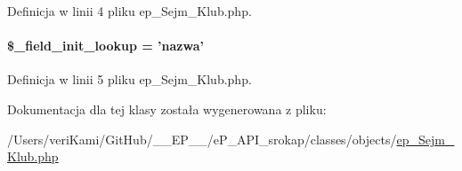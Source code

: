 Definicja w linii 4 pliku ep\-\_\-\-Sejm\-\_\-\-Klub.\-php.

\hypertarget{classep___sejm___klub_a4a4d54ae35428077a7c61ec8a5139af3}{
\paragraph[{\$\-\_\-field\-\_\-init\-\_\-lookup}]{\setlength{\rightskip}{0pt plus 5cm}\$\-\_\-field\-\_\-init\-\_\-lookup = 'nazwa'}}\label{classep___sejm___klub_a4a4d54ae35428077a7c61ec8a5139af3}


Definicja w linii 5 pliku ep\-\_\-\-Sejm\-\_\-\-Klub.\-php.



Dokumentacja dla tej klasy została wygenerowana z pliku\-:\begin{DoxyCompactItemize}
\item 
/\-Users/veri\-Kami/\-Git\-Hub/\-\_\-\-\_\-\-E\-P\-\_\-\-\_\-/e\-P\-\_\-\-A\-P\-I\-\_\-srokap/classes/objects/\hyperlink{ep___sejm___klub_8php}{ep\-\_\-\-Sejm\-\_\-\-Klub.\-php}\end{DoxyCompactItemize}
